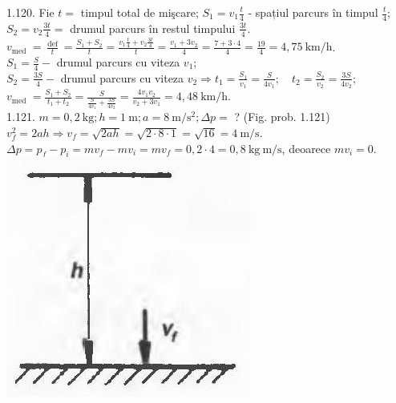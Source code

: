 \documentclass[10pt]{article}
\begin{document}
1.120. Fie $t=$ timpul total de mişcare; $S_{1}=v_{1} \frac{t}{4}$ - spațiul parcurs în timpul $\frac{t}{4}$; $S_{2}=v_{2} \frac{3 t}{4}=$ drumul parcurs în restul timpului $\frac{3 t}{4}$.\\
$v_{\text {med }}=\frac{\operatorname{def}}{t}=\frac{S_{1}+S_{2}}{t}=\frac{v_{1} \frac{t}{4}+v_{2} \frac{3 t}{4}}{t}=\frac{v_{1}+3 v_{2}}{4}=\frac{7+3 \cdot 4}{4}=\frac{19}{4}=4,75 \mathrm{~km} / \mathrm{h}$.\\
$S_{1}=\frac{S}{4}-$ drumul parcurs cu viteza $v_{1}$;\\
$S_{2}=\frac{3 S}{4}-$ drumul parcurs cu viteza $v_{2} \Rightarrow t_{1}=\frac{S_{1}}{v_{1}}=\frac{S}{4 v_{1}} ; \quad t_{2}=\frac{S_{2}}{v_{2}}=\frac{3 S}{4 v_{2}} ;$\\
$v_{\text {med }}=\frac{S_{1}+S_{2}}{t_{1}+t_{2}}=\frac{S}{\frac{S}{4 v_{1}}+\frac{3 S}{4 v_{2}}}=\frac{4 v_{1} v_{2}}{v_{2}+3 v_{1}}=4,48 \mathrm{~km} / \mathrm{h}$.\\
1.121. $m=0,2 \mathrm{~kg} ; h=1 \mathrm{~m} ; a=8 \mathrm{~m} / \mathrm{s}^{2} ; \Delta p=$ ? (Fig. prob. 1.121)\\
$v_{f}^{2}=2 a h \Rightarrow v_{f}=\sqrt{2 a h}=\sqrt{2 \cdot 8 \cdot 1}=\sqrt{16}=4 \mathrm{~m} / \mathrm{s}$.\\
$\Delta p=p_{f}-p_{i}=m v_{f}-m v_{i}=m v_{f}=0,2 \cdot 4=0,8 \mathrm{~kg} \mathrm{~m} / \mathrm{s}$, deoarece $m v_{i}=0$.\\
\includegraphics[max width=\textwidth, center]{2025_07_01_5b3ff9fa0d508c8e9f17g-223}
\end{document}
